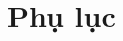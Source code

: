 \clearpage
{}

\chapter*{Phụ lục}
\renewcommand{\thefigure}{A.\arabic{figure}}
\setcounter{figure}{0}
\begin{enumerate}[A$).$]



\end{enumerate}

